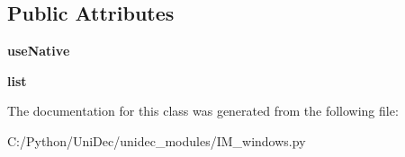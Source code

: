 \subsection*{Public Attributes}
\begin{DoxyCompactItemize}
\item 
\hypertarget{class_uni_dec_1_1unidec__modules_1_1_i_m__windows_1_1_test_list_ctrl_panel4_ae445d13ec935950f2e7fc06cdded45a2}{}{\bfseries use\+Native}\label{class_uni_dec_1_1unidec__modules_1_1_i_m__windows_1_1_test_list_ctrl_panel4_ae445d13ec935950f2e7fc06cdded45a2}

\item 
\hypertarget{class_uni_dec_1_1unidec__modules_1_1_i_m__windows_1_1_test_list_ctrl_panel4_a226af97ebc03604c99a7a5c173c49b2e}{}{\bfseries list}\label{class_uni_dec_1_1unidec__modules_1_1_i_m__windows_1_1_test_list_ctrl_panel4_a226af97ebc03604c99a7a5c173c49b2e}

\end{DoxyCompactItemize}


The documentation for this class was generated from the following file\+:\begin{DoxyCompactItemize}
\item 
C\+:/\+Python/\+Uni\+Dec/unidec\+\_\+modules/I\+M\+\_\+windows.\+py\end{DoxyCompactItemize}

